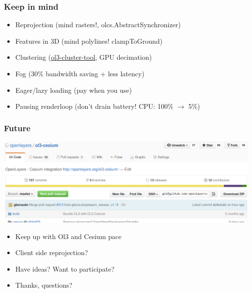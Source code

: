 \documentclass{beamer}
\begin{document}
  \begin{frame}
    \frametitle{Keep in mind}
    \begin{itemize}
      \item Reprojection (mind rasters!, olcs.AbstractSynchronizer)
        \pause
      \item Features in 3D (mind polylines! clampToGround)
        \pause
      \item Clustering (\href{https://github.com/gberaudo/ol3-cluster-tool}{ol3-cluster-tool}, GPU decimation)
        \pause
      \item Fog (30\% bandwidth saving + less latency)
        \pause
      \item Eager/lazy loading (pay when you use)
        \pause
      \item Pausing renderloop (don't drain battery! CPU: 100\% $\rightarrow$ 5\%)
    \end{itemize}
  \end{frame}



  \begin{frame}
    \frametitle{Future}
    \vspace{-20pt}\begin{center}
      \includegraphics[width=0.9\linewidth]{./github2.png}
    \end{center}
    \begin{itemize}
      \item Keep up with Ol3 and Cesium pace
        \pause
      \item Client side reprojection?
        \pause
      \item Have ideas? Want to participate?
        \pause
      \item Thanks, questions?
    \end{itemize}
  \end{frame}
\end{document}
